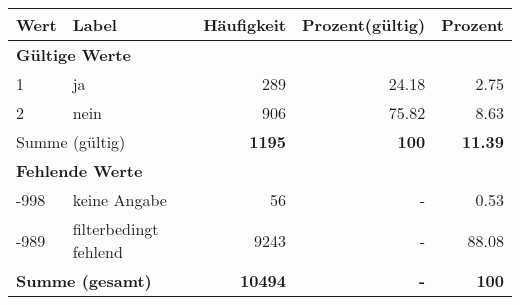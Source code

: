      \begin{longtable}{lXrrr}
     \toprule
     \textbf{Wert} & \textbf{Label} & \textbf{Häufigkeit} & \textbf{Prozent(gültig)} & \textbf{Prozent} \\
     \endhead
     \midrule
     \multicolumn{5}{l}{\textbf{Gültige Werte}}\\

     1 &
     \multicolumn{1}{X}{ ja   } &


       \num{289} &
       \num[round-mode=places,round-precision=2]{24.18} &
         \num[round-mode=places,round-precision=2]{2.75} \\

     2 &
     \multicolumn{1}{X}{ nein   } &


       \num{906} &
       \num[round-mode=places,round-precision=2]{75.82} &
         \num[round-mode=places,round-precision=2]{8.63} \\
     \midrule
     \multicolumn{2}{l}{Summe (gültig)} &
       \textbf{\num{1195}} &
     \textbf{\num{100}} &
       \textbf{\num[round-mode=places,round-precision=2]{11.39}} \\
     \multicolumn{5}{l}{\textbf{Fehlende Werte}}\\
       -998 &
       keine Angabe &
         \num{56} &
        - &
         \num[round-mode=places,round-precision=2]{0.53} \\
       -989 &
       filterbedingt fehlend &
         \num{9243} &
        - &
         \num[round-mode=places,round-precision=2]{88.08} \\
     \midrule
     \multicolumn{2}{l}{\textbf{Summe (gesamt)}} &
          \textbf{\num{10494}} &
        \textbf{-} &
        \textbf{\num{100}} \\
     \bottomrule
     \end{longtable}
     
